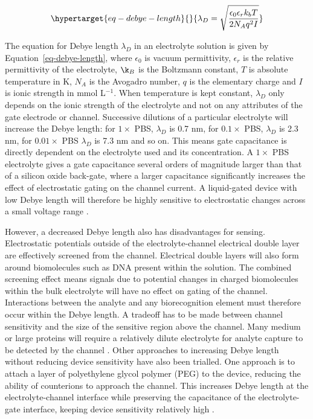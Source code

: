 \documentclass[
  a4paper,
]{scrbook}
\begin{document}
\begin{equation}\protect\hypertarget{eq-debye-length}{}{
\lambda_D = \sqrt{\frac{\epsilon_0\epsilon_rk_bT}{2N_Aq^2I}}
}\label{eq-debye-length}\end{equation}

The equation for Debye length \(\lambda_D\) in an electrolyte solution
is given by Equation~\ref{eq-debye-length}, where \(\epsilon_0\) is
vacuum permittivity, \(\epsilon_r\) is the relative permittivity of the
electrolyte, \(\k_B\) is the Boltzmann constant, \(T\) is absolute
temperature in K, \(N_A\) is the Avogadro number, \(q\) is the
elementary charge and \(I\) is ionic strength in mmol L\(^{-1}\). When
temperature is kept constant, \(\lambda_D\) only depends on the ionic
strength of the electrolyte and not on any attributes of the gate
electrode or channel. Successive dilutions of a particular electrolyte
will increase the Debye length: for \(1 \times\) PBS, \(\lambda_D\) is
0.7 nm, for \(0.1 \times\) PBS, \(\lambda_D\) is 2.3 nm, for
\(0.01 \times\) PBS \(\lambda_D\) is 7.3 nm and so on. This means gate
capacitance is directly dependent on the electrolyte used and its
concentration. A \(1 \times\) PBS electrolyte gives a gate capacitance
several orders of magnitude larger than that of a silicon oxide
back-gate, where a larger capacitance significantly increases the effect
of electrostatic gating on the channel current. A liquid-gated device
with low Debye length will therefore be highly sensitive to
electrostatic changes across a small voltage range
\autocite{Israelachvili2011,Shkodra2021}.

However, a decreased Debye length also has disadvantages for sensing.
Electrostatic potentials outside of the electrolyte-channel electrical
double layer are effectively screened from the channel. Electrical
double layers will also form around biomolecules such as DNA present
within the solution. The combined screening effect means signals due to
potential changes in charged biomolecules within the bulk electrolyte
will have no effect on gating of the channel. Interactions between the
analyte and any biorecognition element must therefore occur within the
Debye length. A tradeoff has to be made between channel sensitivity and
the size of the sensitive region above the channel. Many medium or large
proteins will require a relatively dilute electrolyte for analyte
capture to be detected by the channel
\autocite{Stern2007,Piccinini2018,Shkodra2021}. Other approaches to
increasing Debye length without reducing device sensitivity have also
been trialled. One approach is to attach a layer of polyethylene glycol
polymer (PEG) to the device, reducing the ability of counterions to
approach the channel. This increases Debye length at the
electrolyte-channel interface while preserving the capacitance of the
electrolyte-gate interface, keeping device sensitivity relatively high
\autocite{Gao2016,Kesler2020}.
\end{document}
